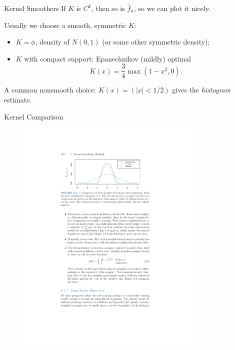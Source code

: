 \documentclass[11pt,handout,xcolor=pdftex,dvipsnames,table,mathserif]{beamer}
\begin{document}
\begin{frame}{Kernel Smoothers}
If $K$ is $C^k$, then so is ${\hat f}_n$, so we can plot it nicely.

\pause

Usually we choose a smooth, symmetric $K$:



\pause




\begin{itemize}[<+->]
\item $K=\phi$, density of $N(0,1)$ (or some other symmetric density);
\item $K$ with compact support: Epanechnikov (mildly) optimal
\[
K(x)= \frac{3}{4} \max(1-x^2,0).
\]
\end{itemize}
\pause
A common nonsmooth choice: $K(x)=(|x|<1/2)$ gives the {\em histogram}
estimate.
\end{frame}

\begin{frame}{Kernel Comparison}
\begin{figure}[htbp]
\begin{center}
\includegraphics[width=3.5in]{./resources/kernelfig.pdf}
\label{classOLS}
\end{center}
\end{figure}
\end{frame}
\end{document}
